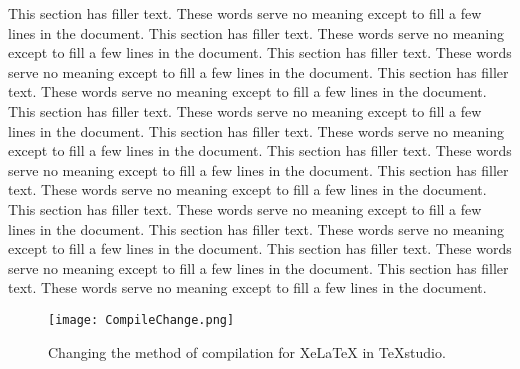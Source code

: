 This section has filler text. These words serve no meaning except to fill a few lines in the document. This section has filler text. These words serve no meaning except to fill a few lines in the document. This section has filler text. These words serve no meaning except to fill a few lines in the document. This section has filler text. These words serve no meaning except to fill a few lines in the document. This section has filler text. These words serve no meaning except to fill a few lines in the document. This section has filler text. These words serve no meaning except to fill a few lines in the document. This section has filler text. These words serve no meaning except to fill a few lines in the document. This section has filler text. These words serve no meaning except to fill a few lines in the document. This section has filler text. These words serve no meaning except to fill a few lines in the document. This section has filler text. These words serve no meaning except to fill a few lines in the document. This section has filler text. These words serve no meaning except to fill a few lines in the document. This section has filler text. These words serve no meaning except to fill a few lines in the document.

\begin{figure}[!h]
	\centering
	\texttt{[image: CompileChange.png]}
	\caption{Changing the method of compilation for XeLaTeX in TeXstudio.}
\end{figure}

